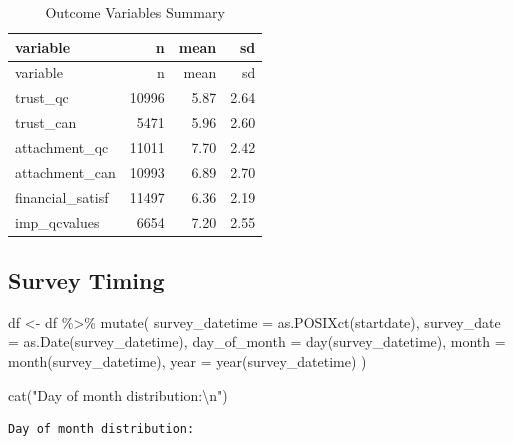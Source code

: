 \documentclass[
  letterpaper,
  DIV=11,
  numbers=noendperiod]{scrartcl}
\newenvironment{Shaded}{\begin{snugshade}}{\end{snugshade}}
\newcommand{\AttributeTok}[1]{\textcolor[rgb]{0.40,0.45,0.13}{#1}}
\newcommand{\FunctionTok}[1]{\textcolor[rgb]{0.28,0.35,0.67}{#1}}
\newcommand{\NormalTok}[1]{\textcolor[rgb]{0.00,0.23,0.31}{#1}}
\newcommand{\OtherTok}[1]{\textcolor[rgb]{0.00,0.23,0.31}{#1}}
\newcommand{\SpecialCharTok}[1]{\textcolor[rgb]{0.37,0.37,0.37}{#1}}
\newcommand{\StringTok}[1]{\textcolor[rgb]{0.13,0.47,0.30}{#1}}
\begin{document}
\begin{longtable}[]{@{}lrrr@{}}
\caption{Outcome Variables Summary}\tabularnewline
\toprule\noalign{}
variable & n & mean & sd \\
\midrule\noalign{}
\endfirsthead
\toprule\noalign{}
variable & n & mean & sd \\
\midrule\noalign{}
\endhead
\bottomrule\noalign{}
\endlastfoot
trust\_qc & 10996 & 5.87 & 2.64 \\
trust\_can & 5471 & 5.96 & 2.60 \\
attachment\_qc & 11011 & 7.70 & 2.42 \\
attachment\_can & 10993 & 6.89 & 2.70 \\
financial\_satisf & 11497 & 6.36 & 2.19 \\
imp\_qcvalues & 6654 & 7.20 & 2.55 \\
\end{longtable}

\hypertarget{survey-timing}{%
\subsection{Survey Timing}\label{survey-timing}}

\begin{Shaded}
\begin{Highlighting}[]
\NormalTok{df }\OtherTok{\textless{}{-}}\NormalTok{ df }\SpecialCharTok{\%\textgreater{}\%}
  \FunctionTok{mutate}\NormalTok{(}
    \AttributeTok{survey\_datetime =} \FunctionTok{as.POSIXct}\NormalTok{(startdate),}
    \AttributeTok{survey\_date =} \FunctionTok{as.Date}\NormalTok{(survey\_datetime),}
    \AttributeTok{day\_of\_month =} \FunctionTok{day}\NormalTok{(survey\_datetime),}
    \AttributeTok{month =} \FunctionTok{month}\NormalTok{(survey\_datetime),}
    \AttributeTok{year =} \FunctionTok{year}\NormalTok{(survey\_datetime)}
\NormalTok{  )}

\FunctionTok{cat}\NormalTok{(}\StringTok{"Day of month distribution:}\SpecialCharTok{\textbackslash{}n}\StringTok{"}\NormalTok{)}
\end{Highlighting}
\end{Shaded}

\begin{verbatim}
Day of month distribution:
\end{verbatim}

\begin{Shaded}
\end{Shaded}
\end{document}
